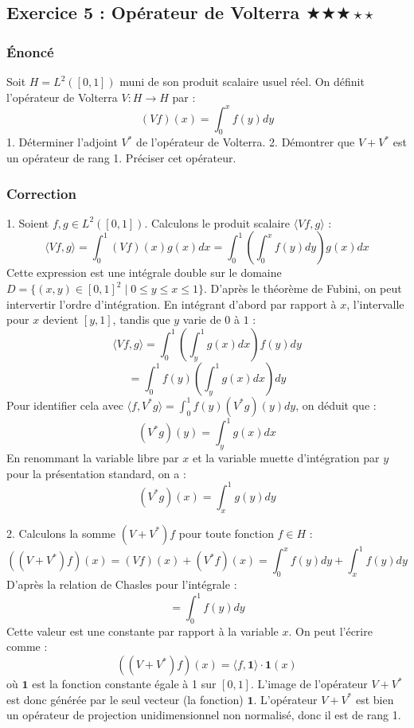 \documentclass[11pt,a4paper]{article}
\begin{document}
\subsection*{Exercice 5 : Opérateur de Volterra $\bigstar\bigstar\bigstar\star\star$}
\subsubsection*{Énoncé}
Soit $H = L^2([0,1])$ muni de son produit scalaire usuel réel.
On définit l'opérateur de Volterra $V : H \to H$ par :
$$ (Vf)(x) = \int_0^x f(y) dy $$
1. Déterminer l'adjoint $V^*$ de l'opérateur de Volterra.
2. Démontrer que $V + V^*$ est un opérateur de rang 1. Préciser cet opérateur.

\subsubsection*{Correction}
1. Soient $f, g \in L^2([0,1])$. Calculons le produit scalaire $\langle Vf, g \rangle$ :
$$ \langle Vf, g \rangle = \int_0^1 (Vf)(x) g(x) dx = \int_0^1 \left( \int_0^x f(y) dy \right) g(x) dx $$
Cette expression est une intégrale double sur le domaine $D = \{ (x,y) \in [0,1]^2 \mid 0 \le y \le x \le 1 \}$.
D'après le théorème de Fubini, on peut intervertir l'ordre d'intégration. En intégrant d'abord par rapport à $x$, l'intervalle pour $x$ devient $[y, 1]$, tandis que $y$ varie de $0$ à $1$ :
$$ \langle Vf, g \rangle = \int_0^1 \left( \int_y^1 g(x) dx \right) f(y) dy $$
$$ = \int_0^1 f(y) \left( \int_y^1 g(x) dx \right) dy $$
Pour identifier cela avec $\langle f, V^*g \rangle = \int_0^1 f(y) (V^*g)(y) dy$, on déduit que :
$$ (V^*g)(y) = \int_y^1 g(x) dx $$
En renommant la variable libre par $x$ et la variable muette d'intégration par $y$ pour la présentation standard, on a :
$$ (V^*g)(x) = \int_x^1 g(y) dy $$

2. Calculons la somme $(V + V^*)f$ pour toute fonction $f \in H$ :
$$ ((V + V^*)f)(x) = (Vf)(x) + (V^*f)(x) = \int_0^x f(y) dy + \int_x^1 f(y) dy $$
D'après la relation de Chasles pour l'intégrale :
$$ = \int_0^1 f(y) dy $$
Cette valeur est une constante par rapport à la variable $x$. On peut l'écrire comme :
$$ ((V + V^*)f)(x) = \langle f, \mathbf{1} \rangle \cdot \mathbf{1}(x) $$
où $\mathbf{1}$ est la fonction constante égale à 1 sur $[0,1]$.
L'image de l'opérateur $V + V^*$ est donc générée par le seul vecteur (la fonction) $\mathbf{1}$.
L'opérateur $V + V^*$ est bien un opérateur de projection unidimensionnel non normalisé, donc il est de rang 1.
\end{document}

